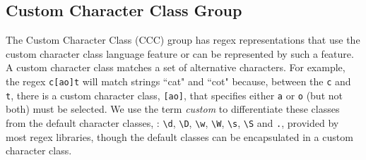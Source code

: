 \subsection{Custom Character Class Group}
The Custom Character Class (CCC) group has regex representations that use the custom character class language feature or can be represented by such a feature.
 A custom character class matches a set of alternative characters. For example, the regex \verb!c[ao]t! will match strings ``cat" and ``cot" because, between the \verb!c! and \verb!t!, there is a custom character class, \verb![ao]!, that specifies either \verb!a! or \verb!o! (but not both) must be selected. We use the term \emph{custom} to differentiate these classes from the default character classes, : \verb!\d!, \verb!\D!, \verb!\w!, \verb!\W!, \verb!\s!, \verb!\S! and \verb!.!, provided by most regex libraries, though the default classes can be encapsulated in a custom character class. %
